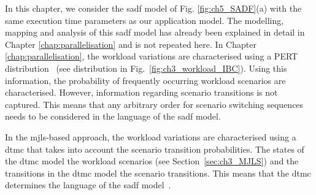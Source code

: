 In this chapter, we consider the \gls{sadf} model of Fig. \ref{fig:ch5_SADF}(a) with the same execution time parameters as our application model. The modelling, mapping and analysis of this \gls{sadf} model has already been explained in detail in Chapter \ref{chap:parallelisation} and is not repeated here. 
In Chapter \ref{chap:parallelisation}, the workload variations are characterised using a PERT distribution~\cite{adyanthaya2014robustness} (see distribution in Fig.~\ref{fig:ch3_workload_IBC}). Using this information, the probability of frequently occurring workload scenarios are characterised. However, information regarding scenario transitions is not captured. This means that any arbitrary order for scenario switching sequences needs to be considered in the language of the \gls{sadf} model.

In the \gls{mjls}-based approach, the workload variations are characterised using a \gls{dtmc} that takes into account the scenario transition probabilities. The states of the \gls{dtmc} model the workload scenarios (see Section~\ref{sec:ch3_MJLS}) and the transitions in the \gls{dtmc} model the scenario transitions. This means that the \gls{dtmc} determines the language of the \gls{sadf} model~\cite{theelen2006scenario}.